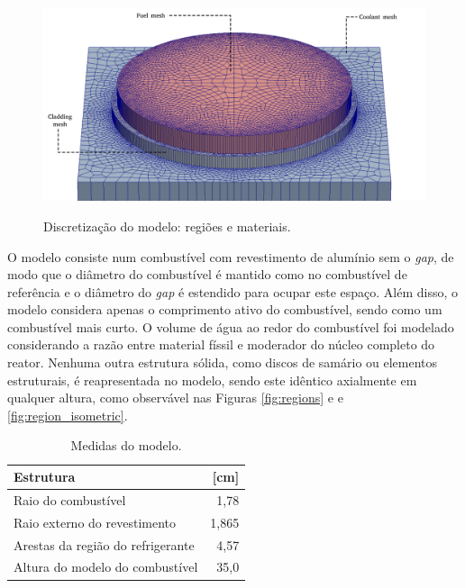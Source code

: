 \begin{figure}[htb]
  \caption{Discretização do modelo: regiões e materiais.}
  \centering\includegraphics[scale=0.5]{figuras/regioes_edges_com_legenda_ingles.png}
  \label{fig:modelo_exploded}
\end{figure}

O modelo consiste num combustível com revestimento de alumínio sem
o \textit{gap}, de modo que o diâmetro do combustível é mantido como no
combustível de referência e o diâmetro do \textit{gap} é estendido para
ocupar este espaço. Além disso, o modelo considera apenas o comprimento
ativo do combustível, sendo como um combustível mais curto. O volume
de água ao redor do combustível foi modelado considerando a razão entre
material físsil e moderador do núcleo completo do reator. Nenhuma outra
estrutura sólida, como discos de samário ou elementos estruturais, é
reapresentada no modelo, sendo este idêntico axialmente em qualquer
altura, como observável nas Figuras \ref{fig:regions} e  e \ref{fig:region_isometric}.

\begin{table}[htb]
  \centering
  \caption[Medidas do modelo.]{Medidas do modelo.}
  \label{tab:size_model}
  \begin{tabular}{lr}
    Estrutura                         & {[}cm{]} \\ \hline
    Raio do combustível               & 1,78     \\
    Raio externo do revestimento      & 1,865    \\
    Arestas da região do refrigerante & 4,57     \\ \hline
    Altura do modelo do combustível   & 35,0    
  \end{tabular}
\end{table}

